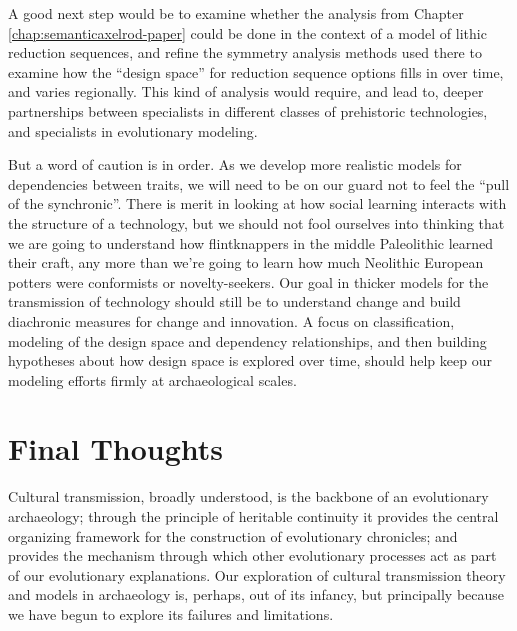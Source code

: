 A good next step would be to examine whether the analysis from Chapter \ref{chap:semanticaxelrod-paper} could be done in the context of a model of lithic reduction sequences, and refine the symmetry analysis methods used there to examine how the ``design space'' for reduction sequence options fills in over time, and varies regionally.  This kind of analysis would require, and lead to, deeper partnerships between specialists in different classes of prehistoric technologies, and specialists in evolutionary modeling.  

But a word of caution is in order.  As we develop more realistic models for dependencies between traits, we will need to be on our guard not to feel the ``pull of the synchronic''.  There is merit in looking at how social learning interacts with the structure of a technology, but we should not fool ourselves into thinking that we are going to understand how flintknappers in the middle Paleolithic learned their craft, any more than we're going to learn how much Neolithic European potters were conformists or novelty-seekers.  Our goal in thicker models for the transmission of technology should still be to understand change and build diachronic measures for change and innovation.  A focus on classification, modeling of the design space and dependency relationships, and then building hypotheses about how design space is explored over time, should help keep our modeling efforts firmly at archaeological scales. 

\section{Final Thoughts}\label{conc:sec:final-thoughts}

Cultural transmission, broadly understood, is the backbone of an evolutionary archaeology; through the principle of heritable continuity it provides the central organizing framework for the construction of evolutionary chronicles; and provides the mechanism through which other evolutionary processes act as part of our evolutionary explanations.  Our exploration of cultural transmission theory and models in archaeology is, perhaps, out of its infancy, but principally because we have begun to explore its failures and limitations.  

